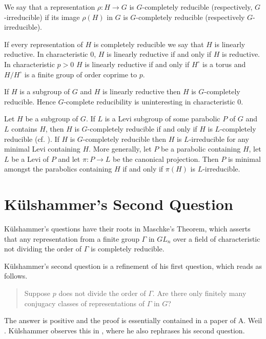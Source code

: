 We say that a representation $\rho:H\rightarrow G$ is $G$-completely reducible (respectively, $G$-irreducible) if its image $\rho(H)$ in $G$ is $G$-completely reducible (respectively $G$-irreducible).

If every representation of $H$ is completely reducible we say that $H$ is linearly reductive. In characteristic 0, $H$ is linearly reductive if and only if $H$ is reductive. In characteristic $p>0$ $H$ is linearly reductive if and only if $H^\circ$ is a torus and $H/H^\circ$ is a finite group of order coprime to $p$.

If $H$ is a subgroup of $G$ and $H$ is linearly reductive then $H$ is $G$-completely reducible. Hence $G$-complete reducibility is uninteresting in characteristic 0.

Let $H$ be a subgroup of $G$. If $L$ is a Levi subgroup of some parabolic $P$ of $G$ and $L$ contains $H$, then $H$ is $G$-completely reducible if and only if $H$ is $L$-completely reducible (cf. \cite[Theorem 3.1]{bate2005geometric}). If $H$ is $G$-completely reducible then $H$ is $L$-irreducible for any minimal Levi containing $H$. More generally, let $P$ be a parabolic containing $H$, let $L$ be a Levi of $P$ and let $\pi:P\rightarrow L$ be the canonical projection. Then $P$ is minimal amongst the parabolics containing $H$ if and only if $\pi(H)$ is $L$-irreducible.

\section{K\"ulshammer's Second Question}

K\"ulshammer's questions have their roots in Maschke's Theorem, which asserts that any representation from a finite group $\Gamma$ in $GL_n$ over a field of characteristic not dividing the order of $\Gamma$ is completely reducible.

K\"ulshammer's second question is a refinement of his first question, which reads as follows.
\begin{quote}
  Suppose $p$ does not divide the order of $\Gamma$. Are there only finitely many conjugacy classes of representations of $\Gamma$ in $G$?
\end{quote}
The answer is positive and the proof is essentially contained in a paper of A. Weil \cite{weil1964remarks}. K\"ulshammer observes this in \cite{kulshammer1995donovan}, where he also rephrases his second question.

